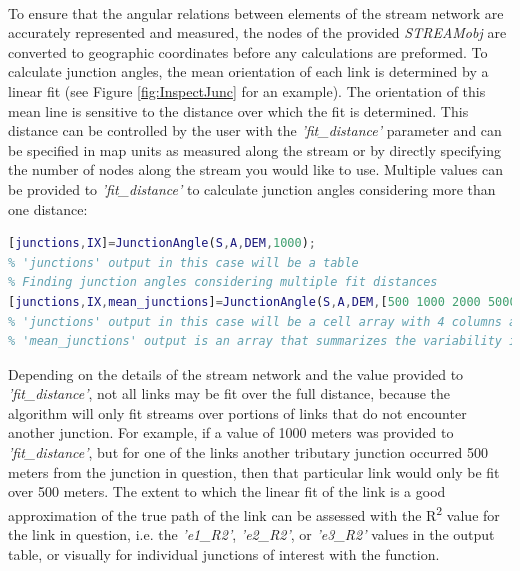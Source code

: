 \paragraph{}To ensure that the angular relations between elements of the stream network are accurately represented and measured, the nodes of the provided \textit{STREAMobj} are converted to geographic coordinates before any calculations are preformed. To calculate junction angles, the mean orientation of each link is determined by a linear fit (see Figure \ref{fig:InspectJunc} for an example). The orientation of this mean line is sensitive to the distance over which the fit is determined. This distance can be controlled by the user with the \textit{'fit\_distance'} parameter and can be specified in map units as measured along the stream or by directly specifying the number of nodes along the stream you would like to use. Multiple values can be provided to \textit{'fit\_distance'} to calculate junction angles considering more than one distance: 

\begin{lstlisting}[language=Matlab]
% Finding junction angles with a single fit distance of 1000 meters
[junctions,IX]=JunctionAngle(S,A,DEM,1000); 
% 'junctions' output in this case will be a table
% Finding junction angles considering multiple fit distances
[junctions,IX,mean_junctions]=JunctionAngle(S,A,DEM,[500 1000 2000 5000]);
% 'junctions' output in this case will be a cell array with 4 columns and containing tables for each different fit distance
% 'mean_junctions' output is an array that summarizes the variability in junction angles across the different fit distances provided
\end{lstlisting}

\noindent
Depending on the details of the stream network and the value provided to \textit{'fit\_distance'}, not all links may be fit over the full distance, because the algorithm will only fit streams over portions of links that do not encounter another junction. For example, if a value of 1000 meters was provided to \textit{'fit\_distance'}, but for one of the links another tributary junction occurred 500 meters from the junction in question, then that particular link would only be fit over 500 meters. The extent to which the linear fit of the link is a good approximation of the true path of the link can be assessed with the R\textsuperscript{2} value for the link in question, i.e. the \textit{'e1\_R2'}, \textit{'e2\_R2'}, or \textit{'e3\_R2'} values in the output table, or visually for individual junctions of interest with the  function.

